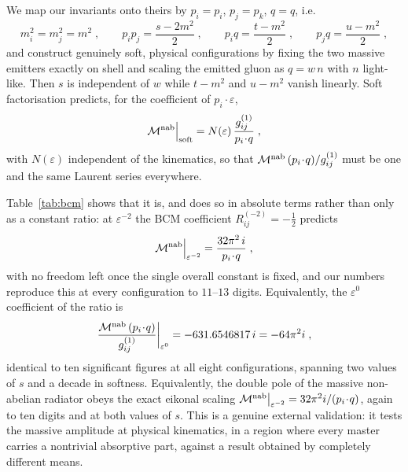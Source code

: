 \documentclass[11pt,a4paper]{article}
\newcommand{\eps}{\varepsilon}
\begin{document}
We map our invariants onto theirs by $p_i=p_i$, $p_j=p_k$, $q=q$, i.e.
\begin{equation}
  m_i^2=m_j^2=m^2\;,\qquad
  p_ip_j=\frac{s-2m^2}{2}\;,\qquad
  p_iq=\frac{t-m^2}{2}\;,\qquad
  p_jq=\frac{u-m^2}{2}\;,
  \label{eq:bcmmap}
\end{equation}
and construct genuinely soft,  {physical} configurations by fixing the two
massive emitters exactly on shell and scaling the emitted gluon as $q=w\,n$ with
$n$ light-like. Then $s$ is independent of $w$ while $t-m^2$ and $u-m^2$ vanish
linearly. Soft factorisation predicts, for the coefficient of $p_i\!\cdot\!\eps$,
\begin{equation}
  \mathcal{M}^{\rm nab}\Big|_{\rm soft}=N(\eps)\,\frac{g^{(1)}_{ij}}{p_i\!\cdot\!q}\;,
  \label{eq:softpred}
\end{equation}
with $N(\eps)$ independent of the kinematics, so that
$\mathcal{M}^{\rm nab}\,(p_i\!\cdot\!q)/g^{(1)}_{ij}$ must be one and the same
Laurent series everywhere.

Table~\ref{tab:bcm} shows that it is, and does so in absolute terms rather than
only as a constant ratio: at $\eps^{-2}$ the BCM coefficient $R^{(-2)}_{ij}=-\tfrac12$
predicts
\begin{equation}
  \mathcal{M}^{\rm nab}\Big|_{\eps^{-2}}=\frac{32\pi^2\,i}{p_i\!\cdot\!q}\;,
  \label{eq:bcm-abs}
\end{equation}
with no freedom left once the single overall constant is fixed, and our numbers
reproduce this at every configuration to $11$--$13$ digits. Equivalently, the
$\eps^0$ coefficient of the ratio is
\begin{equation}
  \frac{\mathcal{M}^{\rm nab}\,(p_i\!\cdot\!q)}{g^{(1)}_{ij}}\bigg|_{\eps^0}
  =-631.6546817\,i=-64\pi^2 i\;,
  \label{eq:bcmresult}
\end{equation}
identical to ten significant figures at all eight configurations, spanning two
values of $s$ and a decade in softness. Equivalently, the double pole of the
massive non-abelian radiator obeys the exact eikonal scaling
$\mathcal{M}^{\rm nab}\big|_{\eps^{-2}}=32\pi^2 i/(p_i\!\cdot\!q)$, again to ten
digits and at both values of $s$. This is a genuine external validation: it tests
the massive amplitude at physical kinematics, in a region where every master
carries a nontrivial absorptive part, against a result obtained by completely
different means.
\end{document}

